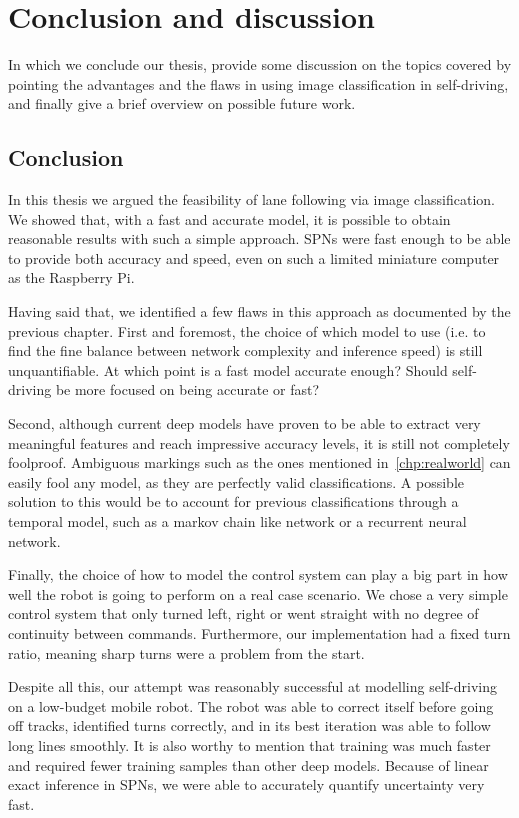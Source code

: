 
\chapter{Conclusion and discussion}\label{chp:conclusions}

In which we conclude our thesis, provide some discussion on the topics covered by pointing the
advantages and the flaws in using image classification in self-driving, and finally give a brief
overview on possible future work.

\section{Conclusion}

In this thesis we argued the feasibility of lane following via image classification. We showed
that, with a fast and accurate model, it is possible to obtain reasonable results with such a
simple approach. SPNs were fast enough to be able to provide both accuracy and speed, even on such
a limited miniature computer as the Raspberry Pi.

Having said that, we identified a few flaws in this approach as documented by the previous chapter.
First and foremost, the choice of which model to use (i.e. to find the fine balance between network
complexity and inference speed) is still unquantifiable. At which point is a fast model accurate
enough? Should self-driving be more focused on being accurate or fast?

Second, although current deep models have proven to be able to extract very meaningful features and
reach impressive accuracy levels, it is still not completely foolproof. Ambiguous markings such as
the ones mentioned in~\autoref{chp:realworld} can easily fool any model, as they are perfectly
valid classifications. A possible solution to this would be to account for previous classifications
through a temporal model, such as a markov chain like network or a recurrent neural network.

Finally, the choice of how to model the control system can play a big part in how well the robot is
going to perform on a real case scenario. We chose a very simple control system that only turned
left, right or went straight with no degree of continuity between commands. Furthermore, our
implementation had a fixed turn ratio, meaning sharp turns were a problem from the start.

Despite all this, our attempt was reasonably successful at modelling self-driving on a low-budget
mobile robot. The robot was able to correct itself before going off tracks, identified turns
correctly, and in its best iteration was able to follow long lines smoothly. It is also worthy to
mention that training was much faster and required fewer training samples than other deep models.
Because of linear exact inference in SPNs, we were able to accurately quantify uncertainty very
fast.

